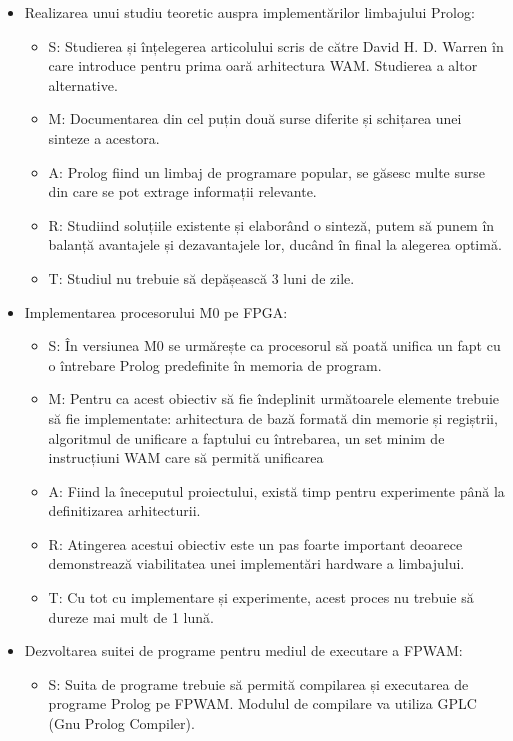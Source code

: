 \documentclass[12pt,a4paper,twoside]{report}
\begin{document}
\begin{itemize}
	\item Realizarea unui studiu teoretic auspra implementărilor limbajului Prolog:
		\begin{itemize}
			\item S: Studierea și înțelegerea articolului scris de către David H. D. Warren în care introduce pentru prima oară arhitectura WAM. Studierea a altor alternative.
			\item M: Documentarea din cel puțin două surse diferite și schițarea unei sinteze a acestora.
			\item A: Prolog fiind un limbaj de programare popular, se găsesc multe surse din care se pot extrage informații relevante.
			\item R: Studiind soluțiile existente și elaborând o sinteză, putem să punem în balanță avantajele și dezavantajele lor, ducând în final la alegerea optimă.
			\item T: Studiul nu trebuie să depășească 3 luni de zile.
		\end{itemize}
	\item Implementarea procesorului M0 pe FPGA:
	\begin{itemize}
		\item S: În versiunea M0 se urmărește ca procesorul să poată unifica un fapt cu o întrebare Prolog predefinite în memoria de program.
		\item M: Pentru ca acest obiectiv să fie îndeplinit următoarele elemente trebuie să fie implementate: arhitectura de bază formată din memorie și regiștrii,  algoritmul de unificare a faptului cu întrebarea, un set minim de instrucțiuni WAM care să permită unificarea
		\item A: Fiind la îneceputul proiectului, există timp pentru experimente până la definitizarea arhitecturii.
		\item R: Atingerea acestui obiectiv este un pas foarte important deoarece demonstrează viabilitatea unei implementări hardware a limbajului.
		\item T: Cu tot cu implementare și experimente, acest proces nu trebuie să dureze mai mult de 1 lună.
	\end{itemize}
	\item Dezvoltarea suitei de programe pentru mediul de executare a FPWAM:
	\begin{itemize}
		\item S: Suita de programe trebuie să permită compilarea și executarea de programe Prolog pe FPWAM. Modulul de compilare va utiliza GPLC (Gnu Prolog Compiler).

\end{itemize}
\end{itemize}
\end{document}
